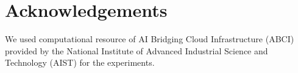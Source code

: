 \section*{Acknowledgements}

We used computational resource of AI Bridging Cloud Infrastructure (ABCI) provided by the National Institute of Advanced Industrial Science and Technology (AIST) for the experiments.
